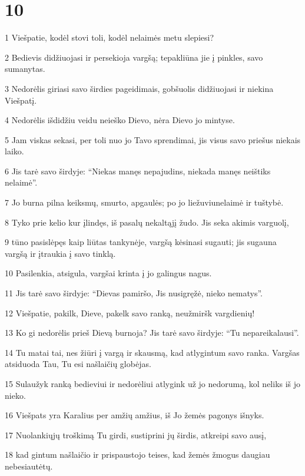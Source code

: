\chapter{10}


\par 1 Viešpatie, kodėl stovi toli, kodėl nelaimės metu slepiesi? 
\par 2 Bedievis didžiuojasi ir persekioja vargšą; tepakliūna jie į pinkles, savo sumanytas. 
\par 3 Nedorėlis giriasi savo širdies pageidimais, gobšuolis didžiuojasi ir niekina Viešpatį. 
\par 4 Nedorėlis išdidžiu veidu neieško Dievo, nėra Dievo jo mintyse. 
\par 5 Jam viskas sekasi, per toli nuo jo Tavo sprendimai, jis visus savo priešus niekais laiko. 
\par 6 Jis tarė savo širdyje: “Niekas manęs nepajudins, niekada manęs neištiks nelaimė”. 
\par 7 Jo burna pilna keiksmų, smurto, apgaulės; po jo liežuviu­nelaimė ir tuštybė. 
\par 8 Tyko prie kelio kur įlindęs, iš pasalų nekaltąjį žudo. Jis seka akimis varguolį, 
\par 9 tūno pasislėpęs kaip liūtas tankynėje, vargšą kėsinasi sugauti; jis sugauna vargšą ir įtraukia į savo tinklą. 
\par 10 Pasilenkia, atsigula, vargšai krinta į jo galingus nagus. 
\par 11 Jis tarė savo širdyje: “Dievas pamiršo, Jis nusigręžė, nieko nematys”. 
\par 12 Viešpatie, pakilk, Dieve, pakelk savo ranką, neužmiršk vargdienių! 
\par 13 Ko gi nedorėlis prieš Dievą burnoja? Jis tarė savo širdyje: “Tu nepareikalausi”. 
\par 14 Tu matai tai, nes žiūri į vargą ir skausmą, kad atlygintum savo ranka. Vargšas atsiduoda Tau, Tu esi našlaičių globėjas. 
\par 15 Sulaužyk ranką bedieviui ir nedorėliui atlygink už jo nedorumą, kol neliks iš jo nieko. 
\par 16 Viešpats yra Karalius per amžių amžius, iš Jo žemės pagonys išnyks. 
\par 17 Nuolankiųjų troškimą Tu girdi, sustiprini jų širdis, atkreipi savo ausį, 
\par 18 kad gintum našlaičio ir prispaustojo teises, kad žemės žmogus daugiau nebesiautėtų.



